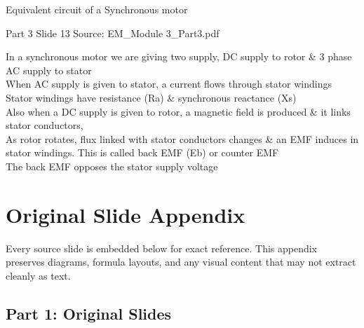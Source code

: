 \documentclass[11pt,a4paper]{article}
\begin{document}
\begin{mdframed}[roundcorner=9pt,backgroundcolor=white,linecolor=anthOrange,linewidth=1pt,innerleftmargin=12pt,innerrightmargin=12pt,innertopmargin=10pt,innerbottommargin=10pt,skipabove=8pt,skipbelow=10pt]
{\HeadingFont\fontsize{15}{18}\selectfont\color{anthDark}Equivalent circuit of a Synchronous motor\par}
{\color{anthMid}\small Part 3 \textbullet{} Slide 13 \textbullet{} Source: EM\_Module 3\_Part3.pdf\par}
\vspace{0.5em}
{\small
\textcolor{anthOrange}{\textbullet}\hspace{0.65em}In a synchronous motor we are giving two supply, DC supply to rotor \& 3 phase AC supply to stator\\
\textcolor{anthOrange}{\textbullet}\hspace{0.65em}When AC supply is given to stator, a current flows through stator windings\\
\textcolor{anthOrange}{\textbullet}\hspace{0.65em}Stator windings have resistance (Ra) \& synchronous reactance (Xs)\\
\textcolor{anthOrange}{\textbullet}\hspace{0.65em}Also when a DC supply is given to rotor, a magnetic field is produced \& it links stator conductors,\\
\textcolor{anthOrange}{\textbullet}\hspace{0.65em}As rotor rotates, flux linked with stator conductors changes \& an EMF induces in stator windings. This is called back EMF (Eb) or counter EMF\\
\textcolor{anthOrange}{\textbullet}\hspace{0.65em}The back EMF opposes the stator supply voltage\\

}
\end{mdframed}

\clearpage
\section{Original Slide Appendix}
Every source slide is embedded below for exact reference. This appendix preserves diagrams, formula layouts, and any visual content that may not extract cleanly as text.

\subsection{Part 1: Original Slides}
\end{document}
